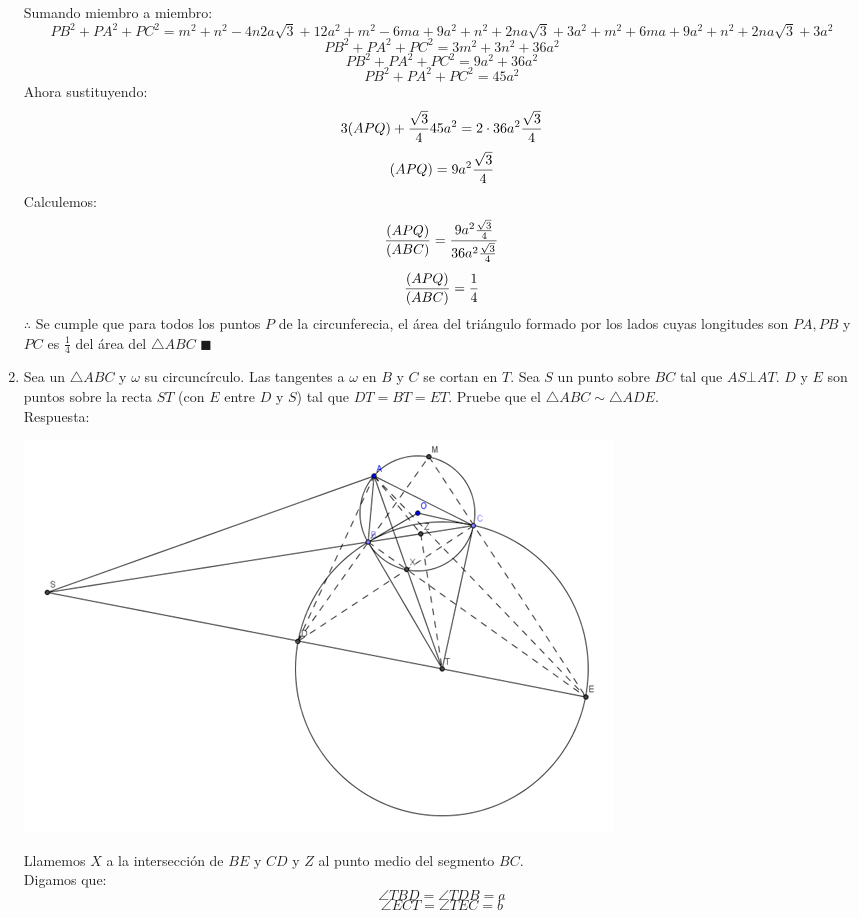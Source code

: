 \documentclass{book}
\begin{document}
\begin{enumerate}
\begin{center}
          \end{center}
          Sumando miembro a miembro:
          $$PB^2+PA^2+PC^2=m^2+n^2-4n2a\sqrt{3}+12a^2+m^2-6ma+9a^2+n^2+2na\sqrt{3}+3a^2+m^2+6ma+9a^2+n^2+2na\sqrt{3}+3a^2$$
          $$PB^2+PA^2+PC^2=3m^2+3n^2+36a^2$$
          $$PB^2+PA^2+PC^2=9a^2+36a^2$$
          $$PB^2+PA^2+PC^2=45a^2$$
          Ahora sustituyendo:
          $$3(APQ)+{\sqrt{3}\over 4}45a^2=2\cdot 36a^2  {\sqrt{3}\over 4}$$
          $$(APQ)=9a^2 {\sqrt{3}\over 4}$$
          Calculemos:
          $$\frac{(APQ)}{(ABC)}=\frac{9a^2  {\sqrt{3}\over 4}}{36a^2  {\sqrt{3}\over 4}}$$
          $$\frac{(APQ)}{(ABC)}={1\over 4}$$
          $\therefore$ Se cumple que para todos los puntos $P$ de la circunferecia, el área del triángulo formado por los lados cuyas longitudes son $PA, PB$ y $PC$ es $\displaystyle{\frac{1}{4}}$ del área del $\triangle ABC$ $\blacksquare$\\
    \item Sea un $\triangle ABC$ y $\omega$ su circuncírculo. Las tangentes a $\omega$ en $B$ y $C$ se cortan en $T$. Sea $S$ un punto sobre $BC$ tal que $AS \bot AT$. $D$ y $E$ son puntos sobre la recta $ST$ (con $E$ entre $D$ y $S$) tal que $DT = BT =ET$. Pruebe que el $\triangle ABC\sim\triangle ADE$. \\
          Respuesta:
          \begin{center}
              \includegraphics[scale=1]{imagenes/Geometria/25,1.png}
          \end{center}
          Llamemos $X$ a la intersección de $BE$ y $CD$ y $Z$ al punto medio del segmento $BC$.\\
          Digamos que:
          $$\angle TBD=\angle TDB=a$$
          $$\angle ECT=\angle TEC=b$$

\end{enumerate}
\end{document}
